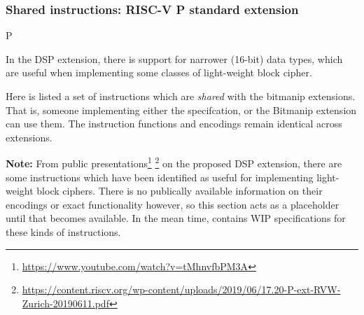 
\subsubsection{Shared instructions: RISC-V P standard extension}
\label{sec:spec:instruction:P}


P~\cite[Chapter 20]{SCARV:RV:ISA:II}

In the DSP extension, there is support for narrower (16-bit)
data types, which are useful when implementing some classes of
light-weight block cipher.

Here is listed a set of instructions which are {\em shared} with
the bitmanip extensions.
That is, someone implementing either the \XCRYPTO specifcation, or
the Bitmanip extension can use them.
The instruction functions and encodings remain identical across extensions.


{\bf Note:} From public presentations\footnote{
\url{https://www.youtube.com/watch?v=tMhnvfbPM3A}
}
\footnote{
\url{https://content.riscv.org/wp-content/uploads/2019/06/17.20-P-ext-RVW-Zurich-20190611.pdf}
}
on the proposed DSP
extension, there are some instructions which have been identified as
useful for implementing light-weight block ciphers.
There is no publically available information on their encodings
or exact functionality however, so this section acts as a placeholder
until that becomes available.
In the mean time,
contains WIP specifications for these kinds of instructions.


